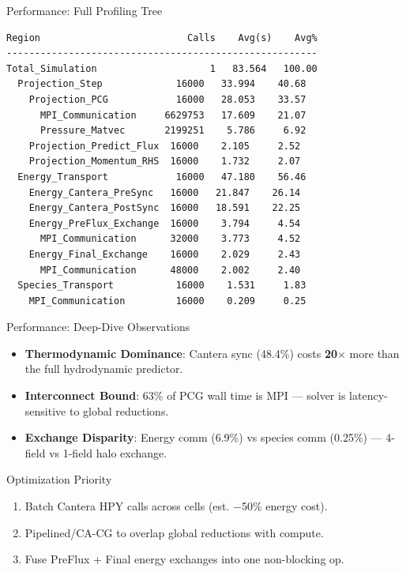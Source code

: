 \documentclass[aspectratio=169,11pt]{beamer}
\begin{document}
\begin{frame}[fragile]{Performance: Full Profiling Tree}
  \begin{lstlisting}[style=profiletree]
Region                          Calls    Avg(s)    Avg%
-------------------------------------------------------
Total_Simulation                    1   83.564   100.00
  Projection_Step             16000   33.994    40.68
    Projection_PCG            16000   28.053    33.57
      MPI_Communication     6629753   17.609    21.07
      Pressure_Matvec       2199251    5.786     6.92
    Projection_Predict_Flux  16000    2.105     2.52
    Projection_Momentum_RHS  16000    1.732     2.07
  Energy_Transport            16000   47.180    56.46
    Energy_Cantera_PreSync   16000   21.847    26.14
    Energy_Cantera_PostSync  16000   18.591    22.25
    Energy_PreFlux_Exchange  16000    3.794     4.54
      MPI_Communication      32000    3.773     4.52
    Energy_Final_Exchange    16000    2.029     2.43
      MPI_Communication      48000    2.002     2.40
  Species_Transport           16000    1.531     1.83
    MPI_Communication         16000    0.209     0.25
  \end{lstlisting}
\end{frame}

\begin{frame}{Performance: Deep-Dive Observations}
  \begin{itemize}
    \item \textbf{Thermodynamic Dominance}: Cantera sync (48.4\%) costs \textbf{20$\times$} more than the full hydrodynamic predictor.
    \item \textbf{Interconnect Bound}: 63\% of PCG wall time is MPI --- solver is latency-sensitive to global reductions.
    \item \textbf{Exchange Disparity}: Energy comm (6.9\%) vs species comm (0.25\%) --- 4-field vs 1-field halo exchange.
  \end{itemize}

  \begin{alertblock}{Optimization Priority}
    \begin{enumerate}
      \item Batch Cantera HPY calls across cells (est. $-$50\% energy cost).
      \item Pipelined/CA-CG to overlap global reductions with compute.
      \item Fuse PreFlux + Final energy exchanges into one non-blocking op.
    \end{enumerate}
  \end{alertblock}
\end{frame}
\end{document}
